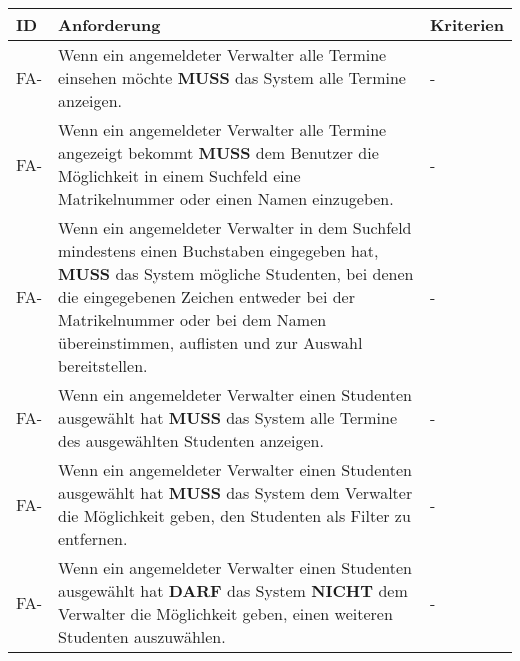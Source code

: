 \begin{tabular} {|p{}|p{11cm}|p{}|}
	\hline
	ID & Anforderung & Kriterien \\
	\hline
	FA-
	& Wenn ein angemeldeter Verwalter alle Termine einsehen möchte \textbf{MUSS} das System alle Termine anzeigen. 
	& - \\
	\hline
	FA-
	& Wenn ein angemeldeter Verwalter alle Termine angezeigt bekommt \textbf{MUSS} dem Benutzer die Möglichkeit in einem Suchfeld eine Matrikelnummer oder einen Namen einzugeben. 
	& - \\
	\hline
	FA-
	& Wenn ein angemeldeter Verwalter in dem Suchfeld mindestens einen Buchstaben eingegeben hat, \textbf{MUSS} das System mögliche Studenten, bei denen die eingegebenen Zeichen entweder bei der Matrikelnummer oder bei dem Namen übereinstimmen, auflisten und zur Auswahl bereitstellen. 
	& - \\
	\hline
	FA-
	& Wenn ein angemeldeter Verwalter einen Studenten ausgewählt hat \textbf{MUSS} das System alle Termine des ausgewählten Studenten anzeigen. 
	& - \\
	\hline
	FA-
	& Wenn ein angemeldeter Verwalter einen Studenten ausgewählt hat \textbf{MUSS} das System dem Verwalter die Möglichkeit geben, den Studenten als Filter zu entfernen. 
	& - \\
	\hline
	FA-
	& Wenn ein angemeldeter Verwalter einen Studenten ausgewählt hat \textbf{DARF} das System \textbf{NICHT} dem Verwalter die Möglichkeit geben, einen weiteren Studenten auszuwählen. 
	& - \\
	\hline
\end{tabular}

\newpage

